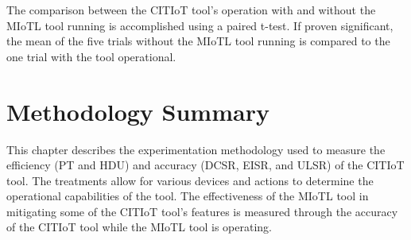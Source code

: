 \documentclass[12pt,letterpaper,oneside]{book}
\begin{document}
		The comparison between the \ac{CITIoT} tool's operation with and without the \ac{MIoTL} tool running is accomplished using a paired t-test. If proven significant, the mean of the five trials without the \ac{MIoTL} tool running is compared to the one trial with the tool operational.
		
		\section{Methodology Summary}
		This chapter describes the experimentation methodology used to measure the efficiency (\ac{PT} and \ac{HDU}) and accuracy (\ac{DCSR}, \ac{EISR}, and \ac{ULSR}) of the \ac{CITIoT} tool. The treatments allow for various devices and actions to determine the operational capabilities of the tool. The effectiveness of the \ac{MIoTL} tool in mitigating some of the \ac{CITIoT} tool's features is measured through the accuracy of the \ac{CITIoT} tool while the \ac{MIoTL} tool is operating.
		
\backmatter
	\singlespace
	
	 
	\clearpage
\end{document}
